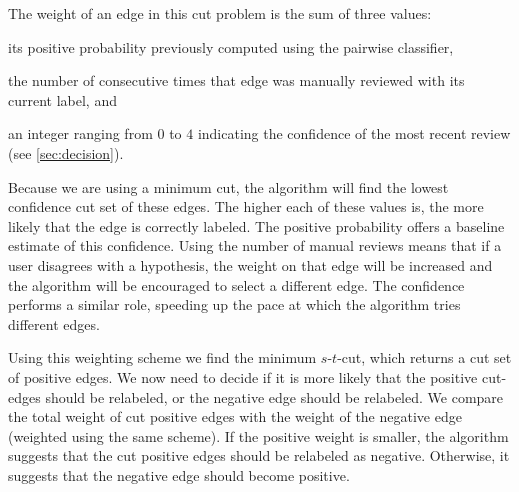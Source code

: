 The weight of an edge in this cut problem is the sum of three values:
\begin{enumln}
    \item its positive probability previously computed using the pairwise classifier,

    \item the number of consecutive times that edge was manually reviewed with
        its current label, and

    \item an integer ranging from $0$ to $4$ indicating the confidence of the most recent review (see
      \cref{sec:decision}).
\end{enumln}
Because we are using a minimum cut, the algorithm will find the lowest confidence cut set of these edges.
The higher each of these values is, the more likely that the edge is correctly labeled.
The positive probability offers a baseline estimate of this confidence.
Using the number of manual reviews means that if a user disagrees with a hypothesis, the weight on that edge will
  be increased and the algorithm will be encouraged to select a different edge.
The confidence performs a similar role, speeding up the pace at which the algorithm tries different edges.

Using this weighting scheme we find the minimum $s$-$t$-cut, which returns a cut set of positive edges.
We now need to decide if it is more likely that the positive cut-edges should be relabeled, or the negative edge
  should be relabeled.
We compare the total weight of cut positive edges with the weight of the negative edge (weighted using the same
  scheme).
If the positive weight is smaller, the algorithm suggests that the cut positive edges should be relabeled as
  negative.
Otherwise, it suggests that the negative edge should become positive.

